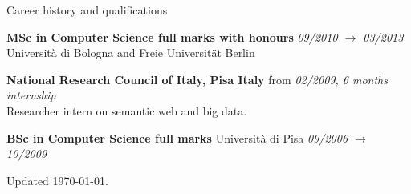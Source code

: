 \documentclass{resume}
\begin{document}
\begin{rSection}{Career history and qualifications}

		{\bf MSc in Computer Science full marks with honours} \hfill {\em  09/2010 $\rightarrow$ 03/2013} \\
		Universit\`a di Bologna and Freie Universit\"at Berlin 

		{\bf National Research Council of Italy, Pisa Italy} \hfill {from \em 02/2009, 6 months internship}\\
			Researcher intern on semantic web and big data.

		{\bf BSc in Computer Science full marks} Universit\`a di Pisa \hfill {\em 09/2006 $\rightarrow$ 10/2009} \\
	\end{rSection}
	\begin{rSection}{}
		Updated \today.
	\end{rSection}
\end{document}
